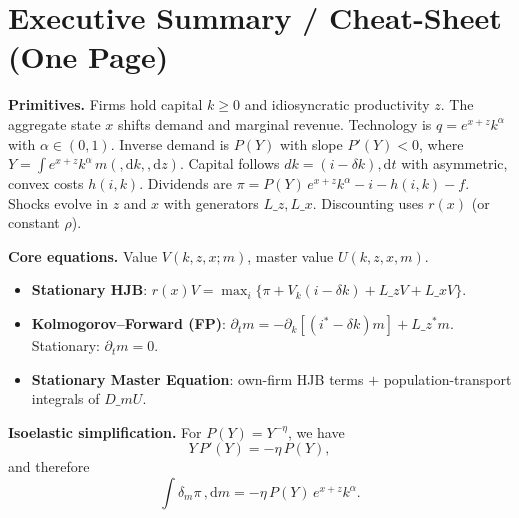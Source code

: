 \documentclass[11pt,letterpaper,oneside]{article}
\numberwithin{equation}{section}
\newcommand{\1}{\mathbf{1}}
\newcommand{\diff}{,\mathrm{d}}
\newcommand{\Lz}{L\_z}
\newcommand{\Lx}{L\_x}
\newcommand{\Lzadj}{L\_z^{\!*}}
\newcommand{\dmU}{D\_m U}
\begin{document}
\clearpage
\newpage
\section*{Executive Summary / Cheat-Sheet (One Page)}
\begin{tcolorbox}[didacticstyle]
\textbf{Primitives.} Firms hold capital $k\!\ge 0$ and idiosyncratic productivity $z$. The aggregate state $x$ shifts demand and marginal revenue. Technology is $q=e^{x+z}k^\alpha$ with $\alpha\in(0,1)$. Inverse demand is $P(Y)$ with slope $P'(Y)<0$, where $Y=\int e^{x+z}k^\alpha\,m(\diff k,\diff z)$. Capital follows $dk=(i-\delta k)\diff t$ with asymmetric, convex costs $h(i,k)$. Dividends are $\pi = P(Y)\,e^{x+z}k^\alpha - i - h(i,k) - f$. Shocks evolve in $z$ and $x$ with generators $\Lz,\Lx$. Discounting uses $r(x)$ (or constant $\rho$).
\medskip

\textbf{Core equations.} Value $V(k,z,x;m)$, master value $U(k,z,x,m)$.
\begin{itemize}[leftmargin=1.25em]
\item \textbf{Stationary HJB}: $r(x)V=\max_i\{\pi+V_k(i-\delta k)+\Lz V+\Lx V\}$.
\item \textbf{Kolmogorov--Forward (FP)}: $\partial_t m=-\partial_k[(i^*-\delta k)m]+\Lzadj m$. Stationary: $\partial_t m=0$.
\item \textbf{Stationary Master Equation}: own-firm HJB terms $+$ population-transport integrals of $\dmU$.

\end{itemize}


\textbf{Isoelastic simplification.} For $P(Y)=Y^{-\eta}$, we have
\[
Y\,P'(Y)=-\eta\,P(Y),
\]
and therefore
\[
\int \delta_m \pi\,\diff m = -\eta\,P(Y)\,e^{x+z}k^\alpha.
\]


\end{tcolorbox}
\end{document}
